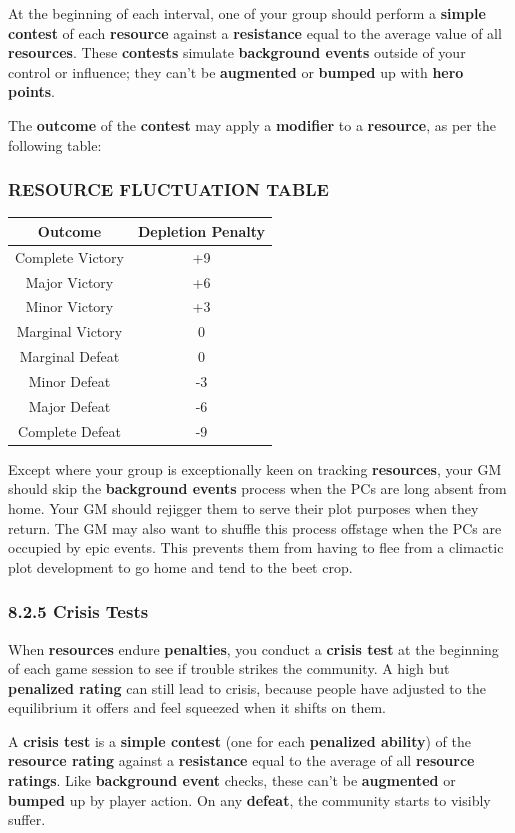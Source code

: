 \documentclass[
]{article}
\begin{document}
At the beginning of each interval, one of your group should perform a
\textbf{simple contest} of each \textbf{resource} against a
\textbf{resistance} equal to the average value of all
\textbf{resources}. These \textbf{contests} simulate \textbf{background
events} outside of your control or influence; they can't be
\textbf{augmented} or \textbf{bumped} up with \textbf{hero points}.

The \textbf{outcome} of the \textbf{contest} may apply a
\textbf{modifier} to a \textbf{resource}, as per the following table:

\hypertarget{resource-fluctuation-table}{%
\subsubsection{RESOURCE FLUCTUATION
TABLE}\label{resource-fluctuation-table}}

\begin{longtable}[]{@{}cc@{}}
\toprule
Outcome & Depletion Penalty\tabularnewline
\midrule
\endhead
Complete Victory & +9\tabularnewline
Major Victory & +6\tabularnewline
Minor Victory & +3\tabularnewline
Marginal Victory & 0\tabularnewline
Marginal Defeat & 0\tabularnewline
Minor Defeat & -3\tabularnewline
Major Defeat & -6\tabularnewline
Complete Defeat & -9\tabularnewline
\bottomrule
\end{longtable}

Except where your group is exceptionally keen on tracking
\textbf{resources}, your GM should skip the \textbf{background events}
process when the PCs are long absent from home. Your GM should rejigger
them to serve their plot purposes when they return. The GM may also want
to shuffle this process offstage when the PCs are occupied by epic
events. This prevents them from having to flee from a climactic plot
development to go home and tend to the beet crop.

\hypertarget{crisis-tests}{%
\subsubsection{8.2.5 Crisis Tests}\label{crisis-tests}}

When \textbf{resources} endure \textbf{penalties}, you conduct a
\textbf{crisis test} at the beginning of each game session to see if
trouble strikes the community. A high but \textbf{penalized rating} can
still lead to crisis, because people have adjusted to the equilibrium it
offers and feel squeezed when it shifts on them.

A \textbf{crisis test} is a \textbf{simple contest} (one for each
\textbf{penalized ability}) of the \textbf{resource rating} against a
\textbf{resistance} equal to the average of all \textbf{resource
ratings}. Like \textbf{background event} checks, these can't be
\textbf{augmented} or \textbf{bumped} up by player action. On any
\textbf{defeat}, the community starts to visibly suffer.
\end{document}
